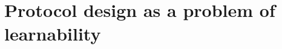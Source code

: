 \section{Protocol design as a problem of learnability}
\label{s: learnability}

\begin{comment}

This section discusses closely related work on congestion control and
explains how our work has an analogy with theoretical notions of
learnability.

\subsection{Congestion control}

Congestion control over packet-switched networks has been a productive
area of research since the seminal work of the 1980s, including
Ramakrishnan and Jain's DECBit scheme~\cite{decbit} and Jacobson's TCP
Tahoe and Reno algorithms~\cite{Jacobson88}. End-to-end algorithms
typically compute a congestion window or a paced transmission rate
using the stream of acknowledgments (ACKs) arriving from the
receiver. In response to congestion, inferred from packet loss or, in
some cases, rising delays, the sender reduces its window or rate;
conversely, when no congestion is perceived, the sender increases its
window or rate.

In this paper, we use the Remy~\cite{remy} protocol-design tool to
generate end-to-end Tao congestion-control schemes from first
principles. The Remy work showed that such an approach can produce
schemes whose performance is competitive with, and often out-performs,
human-generated schemes, including most varieties of TCP congestion
control, on intended target networks.

By contrast, this paper use Remy program as a tool for understanding
the nature of the problem of protocol design without being able to
fully define the intended target networks. We use the program's output
as a proxy for the ``best possible'' Tao congestion-control protocol
intended for a particular imperfect network model, and then ask how
that protocol performs on a different set of networks that varies from
the model in some respect (topology, link speed, behavior of
contending endpoints, etc.).

For reference, we also compare with the most prevalent
congestion-control protocols in wide use, including Linux's TCP
Cubic~\cite{cubic}, and the less-aggressive NewReno
algorithm~\cite{newreno}. End-to-end congestion control may be
assisted with explicit router participation; we also measure the
CoDel~\cite{CoDel} algorithm running with stochastic fair
queueing~\cite{sfq} for ``controlled delay'' at bottleneck gateways.

\subsection{Learnability}

\end{comment}

